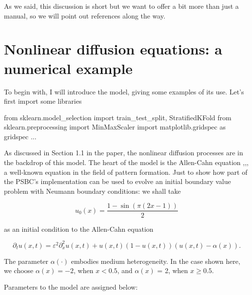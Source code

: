 \documentclass[openany,twoside]{book}
\newenvironment{Shaded}{\begin{snugshade}}{\end{snugshade}}
\newcommand{\ImportTok}[1]{#1}
\newcommand{\NormalTok}[1]{#1}
\begin{document}
As we said, this discussion is short but we want to offer a bit more than just a manual, so we will point out references along the way.

\hypertarget{a_few_examples}{%
\chapter{Nonlinear diffusion equations: a numerical example}\label{a_few_examples}}

To begin with, I will introduce the model, giving some examples of its use. Let's first import some libraries

\begin{Shaded}
\begin{Highlighting}[]
\ImportTok{from}\NormalTok{ sklearn.model_selection }\ImportTok{import}\NormalTok{ train_test_split, StratifiedKFold}
\ImportTok{from}\NormalTok{ sklearn.preprocessing }\ImportTok{import}\NormalTok{ MinMaxScaler}
\ImportTok{import}\NormalTok{ matplotlib.gridspec }\ImportTok{as}\NormalTok{ gridspec}
\NormalTok{...}
\end{Highlighting}
\end{Shaded}

As discussed in Section 1.1 in the paper, the nonlinear diffusion processes are in the backdrop of this model. The heart of the model is the Allen-Cahn equation \citep{Fife},\citep{Ar_Wein},\citep{allen1979microscopic}, a well-known equation in the field of pattern formation. Just to show how part of the PSBC's implementation can be used to evolve an initial boundary value problem with Neumann boundary conditions: we shall take

\begin{equation}
u_0(x) = \frac{1- \sin(\pi(2x - 1))}{2}\label{eq:1}
\end{equation}

as an initial condition to the Allen-Cahn equation

\begin{equation}
\partial_tu(x, t) = \varepsilon^2 \partial_x^2u(x, t) + u(x, t)(1 -  u(x, t))(u(x, t) - \alpha(x)).\label{eq:2}
\end{equation}

The parameter \(\alpha(\cdot)\) embodies medium heterogeneity. In the case shown here, we choose \(\alpha(x) = -2\), when \(x <0.5\), and \(\alpha(x)\) = 2, when \(x \geq 0.5\).

Parameters to the model are assigned below:
\end{document}
